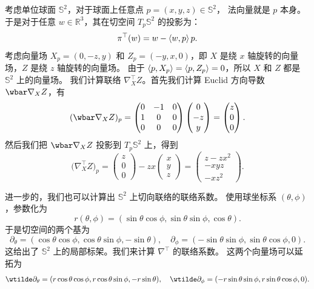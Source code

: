 \begin{example}\label{exa:connection on sphere}
  考虑单位球面 $\mathbb{S}^2$，对于球面上任意点 $p=(x,y,z)\in \mathbb{S}^2$，
  法向量就是 $p$ 本身。于是对于任意 $w\in \mathbb{R}^3$，其在切空间 $T_p \mathbb{S}^2$
  的投影为：
  \[
    \pi^\top(w)=w-\left\langle w,p\right\rangle p.
  \]
  考虑向量场 $X_p=(0,-z,y)$ 和 $Z_p=(-y,x,0)$，即 $X$ 是绕 $x$ 轴旋转的向量场，$Z$ 是绕 $z$ 轴旋转的向量场。
  由于 $\left\langle p,X_p\right\rangle=\left\langle p,Z_p\right\rangle=0$，所以 $X$ 和 $Z$ 都是 $\mathbb{S}^2$ 上的向量场。
  我们计算联络 $\nabla_{X}^\top Z$。首先我们计算 Euclid 方向导数 $\wbar\nabla_XZ$，有
  \[
    (\wbar\nabla_XZ)_p=\begin{pmatrix}
      0 & -1 & 0 \\
      1 & 0 & 0 \\
      0 & 0 & 0
    \end{pmatrix}\begin{pmatrix}
      0 \\ -z \\ y
    \end{pmatrix}=\begin{pmatrix}
      z \\ 0 \\ 0
    \end{pmatrix}.
  \]
  然后我们把 $\wbar\nabla_XZ$ 投影到 $T_p\mathbb{S}^2$ 上，得到
  \[
    \bigl(\nabla^\top_XZ\bigr)_p=\begin{pmatrix}
      z \\ 0 \\ 0
    \end{pmatrix}-zx\begin{pmatrix}
      x \\ y \\ z
    \end{pmatrix}=\begin{pmatrix}
      z-zx^2 \\ -xyz \\ -x z^2
    \end{pmatrix}.
  \]
  
  进一步的，我们也可以计算出 $\mathbb{S}^2$ 上切向联络的联络系数。
  使用球坐标系 $(\theta,\phi)$，参数化为
  \[
    r(\theta,\phi)=(\sin\theta\cos\phi,\sin\theta\sin\phi,\cos\theta).
  \]
  于是切空间的两个基为
  \[
    \partial_\theta=(\cos\theta\cos\phi,\cos\theta\sin\phi,-\sin\theta),\quad
    \partial_\phi=(-\sin\theta\sin\phi,\sin\theta\cos\phi,0).
  \]
  这给出了 $\mathbb{S}^2$ 上的局部标架。我们来计算 $\nabla^\top$ 的联络系数。
  这两个向量场可以延拓为
  \[
    \wtilde\partial_\theta=(r\cos\theta\cos\phi,r\cos\theta\sin\phi,-r\sin\theta),\quad
    \wtilde\partial_\phi=(-r\sin\theta\sin\phi,r\sin\theta\cos\phi,0).
  \]


\end{example}
